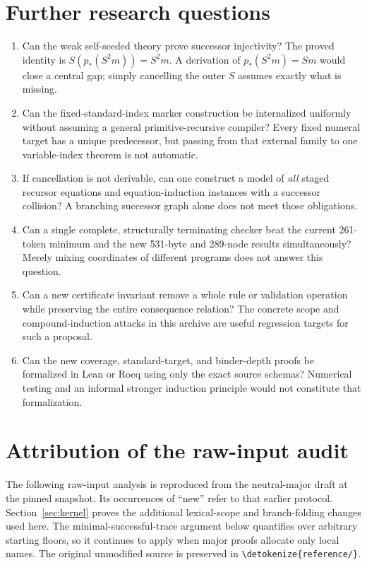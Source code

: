 \documentclass[11pt]{article}
\theoremstyle{definition}\newtheorem{definition}[theorem]{Definition}
\newcommand{\file}[1]{\expandafter\nolinkurl\expandafter{\detokenize{#1}}}
\begin{document}
\section{Further research questions}
\begin{enumerate}
\item Can the weak self-seeded theory prove successor injectivity?
The proved identity is $S(p_*(S^2m))=S^2m$. A derivation of
$p_*(S^2m)=Sm$ would close a central gap; simply cancelling the outer
$S$ assumes exactly what is missing.
\item Can the fixed-standard-index marker construction be internalized
uniformly without assuming a general primitive-recursive compiler?
Every fixed numeral target has a unique predecessor, but passing from
that external family to one variable-index theorem is not automatic.
\item If cancellation is not derivable, can one construct a model of
\emph{all} staged recursor equations and equation-induction instances
with a successor collision? A branching successor graph alone does not
meet those obligations.
\item Can a single complete, structurally terminating checker beat the
current 261-token minimum and the new 531-byte and 289-node results
simultaneously? Merely mixing coordinates of different programs does
not answer this question.
\item Can a new certificate invariant remove a whole rule or validation
operation while preserving the entire consequence relation? The concrete
scope and compound-induction attacks in this archive are useful regression
targets for such a proposal.
\item Can the new coverage, standard-target, and binder-depth proofs be
formalized in Lean or Rocq using only the exact source schemas? Numerical
testing and an informal stronger induction principle would not constitute
that formalization.
\end{enumerate}

\appendix







\section{Attribution of the raw-input audit}
The following raw-input analysis is reproduced from the neutral-major
draft at the pinned snapshot.\cite{neutral} Its occurrences of ``new''
refer to that earlier protocol. Section~\ref{sec:kernel} proves the
additional lexical-scope and branch-folding changes used here. The
minimal-successful-trace argument below quantifies over arbitrary starting
floors, so it continues to apply when major proofs allocate only local
names. The original unmodified source is preserved in \file{reference/}.

\end{document}
